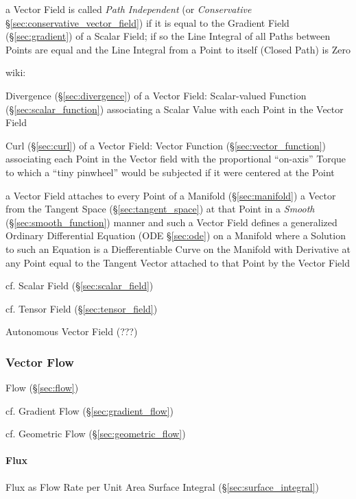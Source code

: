 a Vector Field is called \emph{Path Independent} (or \emph{Conservative}
\S\ref{sec:conservative_vector_field}) if it is equal to the Gradient Field
(\S\ref{sec:gradient}) of a Scalar Field; if so the Line Integral of all Paths
between Points are equal and the Line Integral from a Point to itself (Closed
Path) is Zero

wiki:

Divergence (\S\ref{sec:divergence}) of a Vector Field: Scalar-valued Function
(\S\ref{sec:scalar_function}) associating a Scalar Value with each Point in
the Vector Field

Curl (\S\ref{sec:curl}) of a Vector Field: Vector Function
(\S\ref{sec:vector_function}) associating each Point in the Vector field with
the proportional ``on-axis'' Torque to which a ``tiny pinwheel'' would be
subjected if it were centered at the Point

a Vector Field attaches to every Point of a Manifold (\S\ref{sec:manifold}) a
Vector from the Tangent Space (\S\ref{sec:tangent_space}) at that Point in a
\emph{Smooth} (\S\ref{sec:smooth_function}) manner and such a Vector Field
defines a generalized Ordinary Differential Equation (ODE \S\ref{sec:ode}) on a
Manifold where a Solution to such an Equation is a Diefferentiable Curve on the
Manifold with Derivative at any Point equal to the Tangent Vector attached to
that Point by the Vector Field

cf. Scalar Field (\S\ref{sec:scalar_field})

cf. Tensor Field (\S\ref{sec:tensor_field})

Autonomous Vector Field (???)



\subsubsection{Vector Flow}\label{sec:vector_flow}

Flow (\S\ref{sec:flow})

cf. Gradient Flow (\S\ref{sec:gradient_flow})

cf. Geometric Flow (\S\ref{sec:geometric_flow})



\paragraph{Flux}\label{sec:flux}\hfill

Flux as Flow Rate per Unit Area \fist Surface Integral
(\S\ref{sec:surface_integral})

